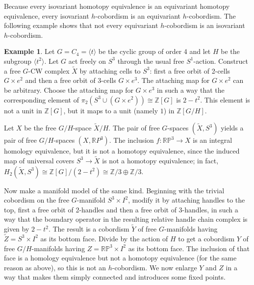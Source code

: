 \documentclass[11pt]{amsart}
\theoremstyle{definition}
\newtheorem{exmp}{Example}[section]
\numberwithin{equation}{section}
\numberwithin{figure}{section}
\newcommand{\R}{\mathbb R}
\newcommand{\Z}{\mathbb Z}
\begin{document}
Because every isovariant homotopy equivalence is an equivariant homotopy equivalence, every isovariant $h$-cobordism is an equivariant $h$-cobordism. The following example shows that not every equivariant $h$-cobordism is an isovariant $h$-cobordism. 
\begin{exmp}\label{gap_counterexample}
	Let $G=C_4 = \langle t\rangle$ be the cyclic group of order 4 and let $H$ be the subgroup $\langle t^2\rangle$. Let $G$ act freely on $S^3$ through the usual free $S^1$-action. Construct a free $G$-CW complex $\widetilde X$ by attaching cells to $S^3$: first a free orbit of 2-cells $G\times e^2$ and then a free orbit of 3-cells $G\times e^3$. The attaching map for $G\times e^2$ can be arbitrary. Choose the attaching map for $G\times e^3$ in such a way that the corresponding element of $\pi_2(S^3\cup (G\times e^2))\cong \Z[G]$ is $2 - t^2$. This element is not a unit in $ \Z[G]$, but it maps to a unit (namely $1$) in $\Z[G/H]$. 
	
	Let $X$ be the free $G/H$-space $\widetilde X/H$. The pair of free $G$-spaces $(\widetilde X,S^3)$ yields a pair of free $G/H$-spaces $(X,\R P^3)$. The inclusion $f\colon \mathbb{RP}^3 \to X$ is an integral homology equivalence, but it is not a homotopy equivalence, since the induced map of universal covers $S^3\to \widetilde{X}$ is not a homotopy equivalence; in fact, $H_2(\widetilde X,S^3)\cong\Z[G]/(2-t^2)\cong \Z/3 \oplus \Z/3$.
	
Now make a manifold model of the same kind. Beginning with the trivial cobordism on the free $G$-manifold $S^3\times I^2$, modify it by attaching handles to the top, first a free orbit of 2-handles and then a free orbit of 3-handles, in such a way that the boundary operator in the resulting relative handle chain complex is given by $2-t^2$. The result is a cobordism $\widetilde Y$ of free $G$-manifolds having $\widetilde Z=S^3\times I^2$ as its bottom face. Divide by the action of $H$ to get a cobordism $Y$ of free $G/H$-manifolds having $Z=\mathbb{RP}^3 \times I^2$ as its bottom face. The inclusion of that face is a homology equivalence but not a homotopy equivalence (for the same reason as above), so this is not an $h$-cobordism. We now enlarge $Y$ and $Z$ in a way that makes them simply connected and introduces some fixed points. 


\end{exmp}
\end{document}
